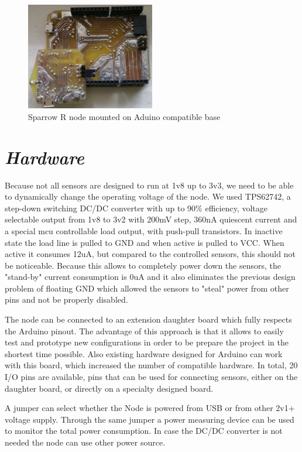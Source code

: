\begin{figure}[ht] \centering
\includegraphics[width=0.5\textwidth]{img/base-with-sensor.jpg}
\caption{Sparrow R node mounted on Aduino compatible base}
\end{figure}

\section{\textit{Hardware}}
Because not all sensors are designed to run at 1v8 up to 3v3, we need to be able to dynamically
change the operating voltage of the node. We used TPS62742, a step-down switching DC/DC converter
with up to 90\% efficiency, voltage selectable output from 1v8 to 3v2 with 200mV step, 360nA
quiescent current and a special mcu controllable load output, with push-pull transistors. In
inactive state the load line is pulled to GND and when active is pulled to VCC. When active it
consumes 12uA, but compared to the controlled sensors, this should not be noticeable. Because this
allows to completely power down the sensors, the "stand-by" current consumption is 0uA and it also
eliminates the previous design problem of floating GND which allowed the sensors to "steal" power
from other pins and not be properly disabled.

The node can be connected to an extension daughter board which fully respects the Arduino pinout.
The advantage of this approach is that it allows to easily test and prototype new configurations in
order to be prepare the project in the shortest time possible. Also existing hardware designed for Arduino can work with this board,
which increased the number of compatible hardware. In total, 20 I/O pins are available, pins that
can be used for connecting sensors, either on the daughter board, or directly on a specialty
designed board.

A jumper can select whether the Node is powered from USB or from other 2v1+ voltage supply. Through
the same jumper a power measuring device can be used to monitor the total power consumption. In case the DC/DC converter is not
needed the node can use other power source.

